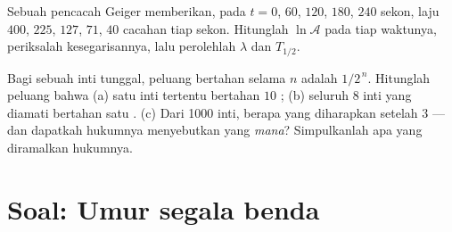 \begin{exercise}[$\star\star\star$]\label{exo:g12:radioactive-decay:14}
Sebuah pencacah Geiger memberikan, pada $t = 0$, $60$, $120$, $180$, $240$ sekon,
laju $400$, $225$, $127$, $71$, $40$ cacahan tiap sekon. Hitunglah
$\ln \mathcal A$ pada tiap waktunya, periksalah kesegarisannya, lalu perolehlah $\lambda$ dan
$T_{1/2}$.
\end{exercise}

\begin{exercise}[$\star\star\star$]\label{exo:g12:radioactive-decay:15}
Bagi sebuah inti tunggal, peluang bertahan selama $n$  adalah
$1/2^{\,n}$. Hitunglah peluang bahwa (a) satu inti tertentu bertahan
$10$ ; (b) seluruh $8$ inti yang diamati bertahan satu .
(c) Dari \num{1000} inti, berapa yang diharapkan setelah $3$  ---
dan dapatkah hukumnya menyebutkan yang \emph{mana}? Simpulkanlah apa yang diramalkan hukumnya.
\end{exercise}

\section{Soal: Umur segala benda}

